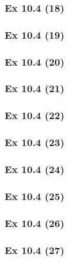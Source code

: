 \subsubsection{Ex 10.4 (18)}\label{sec:Ex_10.4.18}

\subsubsection{Ex 10.4 (19)}\label{sec:Ex_10.4.19}

\subsubsection{Ex 10.4 (20)}\label{sec:Ex_10.4.20}

\newpage		%

\subsubsection{Ex 10.4 (21)}\label{sec:Ex_10.4.21}

\subsubsection{Ex 10.4 (22)}\label{sec:Ex_10.4.22}

\subsubsection{Ex 10.4 (23)}\label{sec:Ex_10.4.23}

\subsubsection{Ex 10.4 (24)}\label{sec:Ex_10.4.24}

\subsubsection{Ex 10.4 (25)}\label{sec:Ex_10.4.25}

\subsubsection{Ex 10.4 (26)}\label{sec:Ex_10.4.26}

\subsubsection{Ex 10.4 (27)}\label{sec:Ex_10.4.27}


